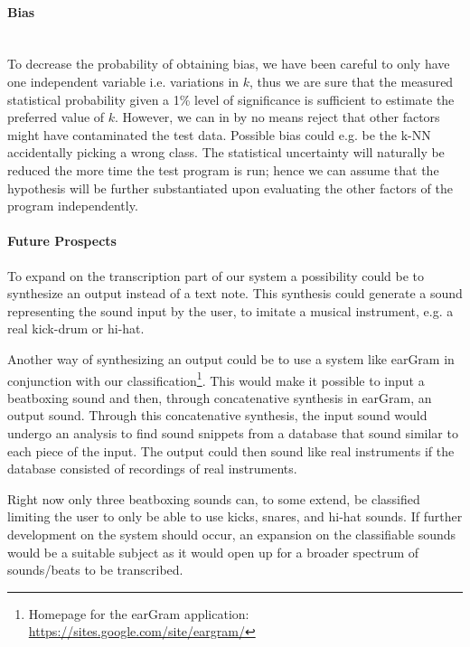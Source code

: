 \paragraph{Bias} \hspace{0pt} \\
To decrease the probability of obtaining bias, we have been careful to only have one independent variable i.e. variations in $k$, thus we are sure that the measured statistical probability given a 1\% level of significance is sufficient to estimate the preferred value of $k$. However, we can in by no means reject that other factors might have contaminated the test data. Possible bias could e.g. be the k-NN accidentally picking a wrong class. The statistical uncertainty will naturally be reduced the more time the test program is run; hence we can assume that the hypothesis will be further substantiated upon evaluating the other factors of the program independently.\\


\paragraph{Future Prospects} \hspace{0pt}
To expand on the transcription part of our system a possibility could be to synthesize an output instead of a text note. This synthesis could generate a sound representing the sound input by the user, to imitate a musical instrument, e.g. a real kick-drum or hi-hat.

Another way of synthesizing an output could be to use a system like earGram in conjunction with our classification\footnote{Homepage for the earGram application: \url{https://sites.google.com/site/eargram/}}. This would make it possible to input a beatboxing sound and then, through concatenative synthesis in earGram, an output sound. Through this concatenative synthesis, the input sound would undergo an analysis to find sound snippets from a database that sound similar to each piece of the input. The output could then sound like real instruments if the database consisted of recordings of real instruments.

Right now only three beatboxing sounds can, to some extend, be classified limiting the user to only be able to use kicks, snares, and hi-hat sounds. If further development on the system should occur, an expansion on the classifiable sounds would be a suitable subject as it would open up for a broader spectrum of sounds/beats to be transcribed.

